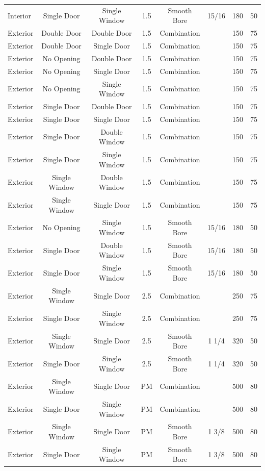 \documentclass{article}
\begin{document}
\begin{table}[!ht]
{\begin{tabular}{|lccccccc|}
Interior & Single Door & Single Window & 1.5 & Smooth Bore & 15/16 & 180 & 50 \\
Exterior & Double Door & Double Door & 1.5 & Combination &  & 150 & 75 \\
Exterior & Double Door & Single Door & 1.5 & Combination &  & 150 & 75 \\
Exterior & No Opening & Double Door & 1.5 & Combination &  & 150 & 75 \\
Exterior & No Opening & Single Door & 1.5 & Combination &  & 150 & 75 \\
Exterior & No Opening & Single Window & 1.5 & Combination &  & 150 & 75 \\
Exterior & Single Door & Double Door & 1.5 & Combination &  & 150 & 75 \\
Exterior & Single Door & Single Door & 1.5 & Combination &  & 150 & 75 \\
Exterior & Single Door & Double Window & 1.5 & Combination &  & 150 & 75 \\
Exterior & Single Door & Single Window & 1.5 & Combination &  & 150 & 75 \\
Exterior & Single Window & Double Window & 1.5 & Combination &  & 150 & 75 \\
Exterior & Single Window & Single Door & 1.5 & Combination &  & 150 & 75 \\
Exterior & No Opening & Single Window & 1.5 & Smooth Bore & 15/16 & 180 & 50 \\
Exterior & Single Door & Double Window & 1.5 & Smooth Bore & 15/16 & 180 & 50 \\
Exterior & Single Door & Single Window & 1.5 & Smooth Bore & 15/16 & 180 & 50 \\
Exterior & Single Window & Single Door & 2.5 & Combination &  & 250 & 75 \\
Exterior & Single Door & Single Window & 2.5 & Combination &  & 250 & 75 \\
Exterior & Single Window & Single Door & 2.5 & Smooth Bore & 1 1/4 & 320 & 50 \\
Exterior & Single Door & Single Window & 2.5 & Smooth Bore & 1 1/4 & 320 & 50 \\
Exterior & Single Window & Single Door & PM & Combination &  & 500 & 80 \\
Exterior & Single Door & Single Window & PM & Combination &  & 500 & 80 \\
Exterior & Single Window & Single Door & PM & Smooth Bore & 1 3/8 & 500 & 80 \\
Exterior & Single Door & Single Window & PM & Smooth Bore & 1 3/8 & 500 & 80 \\

\end{tabular}}
\end{table}
\end{document}
